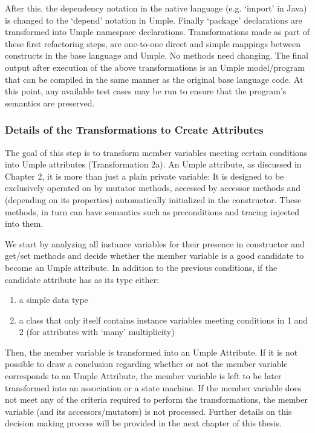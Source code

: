 After this, the dependency notation in the native language (e.g. `import' in Java) is changed to the `depend' notation in Umple. Finally `package' declarations are transformed into Umple namespace declarations. 
Transformations made as part of these first refactoring steps, are one-to-one direct and simple mappings between constructs in the base language and Umple. No methods need changing. The final output after execution of the above transformations is an Umple model/program that can be compiled in the same manner as the original base language code. At this point, any available test cases may be run to ensure that the program's semantics are preserved.

\subsubsection{Details of the Transformations to Create Attributes}

The goal of this step is to transform member variables meeting certain conditions into Umple attributes (Transformation 2a). An Umple attribute, as discussed in Chapter 2, it is more than just a plain private variable: It is designed to be exclusively operated on by mutator methods, accessed by accessor methods and (depending on its properties) automatically initialized in the constructor. These methods, in turn can have semantics such as preconditions and tracing injected into them. 

We start by analyzing all instance variables for their presence in constructor and get/set methods and decide whether the member variable is a good candidate to become an Umple attribute. In addition to the previous conditions, if the candidate attribute has as its type either:

\begin{enumerate}
\item a simple data type
\item a class that only itself contains instance variables meeting conditions in 1 and 2 (for attributes with `many' multiplicity)
\end{enumerate}

Then, the member variable is transformed into an Umple Attribute. If it is not possible to draw a conclusion regarding whether or not the member variable corresponds to an Umple Attribute, the member variable is left to be later transformed into an association or a state machine. If the member variable does not meet any of the criteria required to perform the transformations, the member variable (and its accessors/mutators) is not processed. Further details on this decision making process will be provided in the next chapter of this thesis. 

